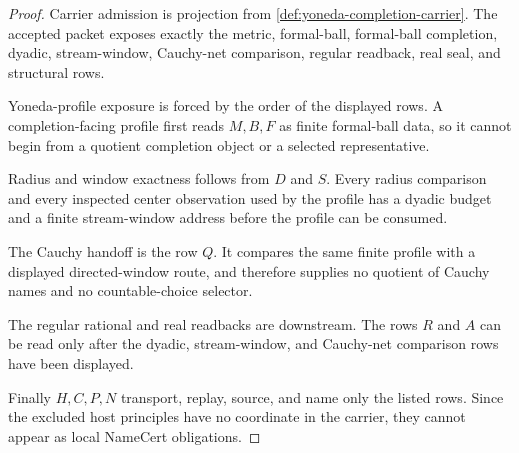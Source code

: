 \begin{proof}
Carrier admission is projection from \autoref{def:yoneda-completion-carrier}. The accepted packet exposes exactly the metric, formal-ball, formal-ball completion, dyadic, stream-window, Cauchy-net comparison, regular readback, real seal, and structural rows.

Yoneda-profile exposure is forced by the order of the displayed rows. A completion-facing profile first reads $M,B,F$ as finite formal-ball data, so it cannot begin from a quotient completion object or a selected representative.

Radius and window exactness follows from $D$ and $S$. Every radius comparison and every inspected center observation used by the profile has a dyadic budget and a finite stream-window address before the profile can be consumed.

The Cauchy handoff is the row $Q$. It compares the same finite profile with a displayed directed-window route, and therefore supplies no quotient of Cauchy names and no countable-choice selector.

The regular rational and real readbacks are downstream. The rows $R$ and $A$ can be read only after the dyadic, stream-window, and Cauchy-net comparison rows have been displayed.

Finally $H,C,P,N$ transport, replay, source, and name only the listed rows. Since the excluded host principles have no coordinate in the carrier, they cannot appear as local NameCert obligations.
\end{proof}

